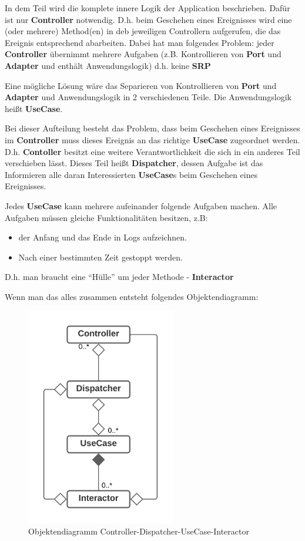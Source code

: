 
In dem Teil wird die komplete innere Logik der Application beschrieben. Dafür ist nur \textbf{Controller} notwendig. 
D.h. beim Geschehen eines Ereignisses wird eine (oder mehrere) Method(en) in deb jeweiligen Controllern aufgerufen,
die das Ereignis entsprechend abarbeiten.
Dabei hat man folgendes Problem:
jeder \textbf{Controller} übernimmt mehrere Aufgaben 
(z.B. Kontrollieren von \textbf{Port} und \textbf{Adapter} und enthält Anwendungslogik)
d.h. keine \textbf{SRP}

Eine mögliche Lösung wäre das Separieren von Kontrollieren von \textbf{Port} und \textbf{Adapter} und Anwendungslogik
in 2 verschiedenen Teile. Die Anwendungslogik heißt \textbf{UseCase}.

Bei dieser Aufteilung besteht das Problem, dass beim Geschehen eines Ereignisses im \textbf{Controller} muss dieses Ereignis an das 
richtige \textbf{UseCase} zugeordnet werden. D.h. \textbf{Contoller} besitzt eine weitere Verantwortlichkeit die sich in ein anderes Teil
verschieben lässt. Dieses Teil heißt \textbf{Dispatcher}, dessen Aufgabe ist das Informieren alle daran Interessierten \textbf{UseCase}s
beim Geschehen eines Ereignisses. 

Jedes \textbf{UseCase} kann mehrere aufeinander folgende Aufgaben machen.
Alle Aufgaben müssen gleiche Funktionalitäten besitzen, z.B:
\begin{itemize}
    \item der Anfang und das Ende in Logs aufzeichnen.
    \item Nach einer bestimmten Zeit gestoppt werden.
\end{itemize}
D.h. man braucht eine ``Hülle'' um jeder Methode - \textbf{Interactor}

Wenn man das alles zusammen entsteht folgendes Objektendiagramm:

\begin{figure}[H]
    \centering
    \includegraphics[width=6.5cm]{./images/Controller-Dispatcher-UseCase-Interactor.png}
     \caption[Objektendiagramm Controller-Dispatcher-UseCase-Interactor]{Objektendiagramm Controller-Dispatcher-UseCase-Interactor \footnotemark}
     \label{fig:CDCDUI}
\end{figure}
